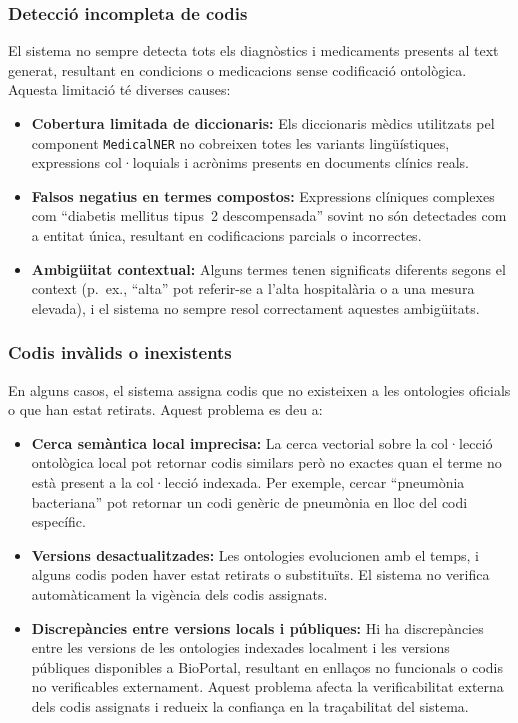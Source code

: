 \documentclass[CAT]{TFUOC}%
\begin{document}
\subsubsection{Detecció incompleta de codis}

El sistema no sempre detecta tots els diagnòstics i medicaments presents al text generat, resultant en condicions o medicacions sense codificació ontològica. Aquesta limitació té diverses causes:

\begin{itemize}
    \item \textbf{Cobertura limitada de diccionaris:} Els diccionaris mèdics utilitzats pel component \texttt{MedicalNER} no cobreixen totes les variants lingüístiques, expressions col·loquials i acrònims presents en documents clínics reals.
    
    \item \textbf{Falsos negatius en termes compostos:} Expressions clíniques complexes com ``diabetis mellitus tipus~2 descompensada'' sovint no són detectades com a entitat única, resultant en codificacions parcials o incorrectes.
    
    \item \textbf{Ambigüitat contextual:} Alguns termes tenen significats diferents segons el context (p.~ex., ``alta'' pot referir-se a l'alta hospitalària o a una mesura elevada), i el sistema no sempre resol correctament aquestes ambigüitats.
\end{itemize}

\subsubsection{Codis invàlids o inexistents}

En alguns casos, el sistema assigna codis que no existeixen a les ontologies oficials o que han estat retirats. Aquest problema es deu a:

\begin{itemize}
    \item \textbf{Cerca semàntica local imprecisa:} La cerca vectorial sobre la col·lecció ontològica local pot retornar codis similars però no exactes quan el terme no està present a la col·lecció indexada. Per exemple, cercar ``pneumònia bacteriana'' pot retornar un codi genèric de pneumònia en lloc del codi específic.
    
    \item \textbf{Versions desactualitzades:} Les ontologies evolucionen amb el temps, i alguns codis poden haver estat retirats o substituïts. El sistema no verifica automàticament la vigència dels codis assignats.
    
    \item \textbf{Discrepàncies entre versions locals i públiques:} Hi ha discrepàncies entre les versions de les ontologies indexades localment i les versions públiques disponibles a BioPortal, resultant en enllaços no funcionals o codis no verificables externament. Aquest problema afecta la verificabilitat externa dels codis assignats i redueix la confiança en la traçabilitat del sistema.
\end{itemize}
\end{document}
